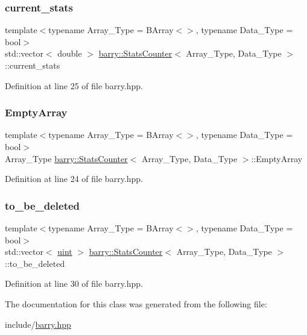\subsubsection{\texorpdfstring{current\+\_\+stats}{current\_stats}}
{\footnotesize\ttfamily template$<$typename Array\+\_\+\+Type  = B\+Array$<$$>$, typename Data\+\_\+\+Type  = bool$>$ \\
std\+::vector$<$ double $>$ \hyperlink{classbarry_1_1_stats_counter}{barry\+::\+Stats\+Counter}$<$ Array\+\_\+\+Type, Data\+\_\+\+Type $>$\+::current\+\_\+stats}



Definition at line 25 of file barry.\+hpp.

\mbox{\label{classbarry_1_1_stats_counter_ad78463fadfa385a69121c40fdc8fd193}} 
\subsubsection{\texorpdfstring{Empty\+Array}{EmptyArray}}
{\footnotesize\ttfamily template$<$typename Array\+\_\+\+Type  = B\+Array$<$$>$, typename Data\+\_\+\+Type  = bool$>$ \\
Array\+\_\+\+Type \hyperlink{classbarry_1_1_stats_counter}{barry\+::\+Stats\+Counter}$<$ Array\+\_\+\+Type, Data\+\_\+\+Type $>$\+::Empty\+Array}



Definition at line 24 of file barry.\+hpp.

\mbox{\label{classbarry_1_1_stats_counter_a332d678489f13664c0aad12cfd1aa725}} 
\subsubsection{\texorpdfstring{to\+\_\+be\+\_\+deleted}{to\_be\_deleted}}
{\footnotesize\ttfamily template$<$typename Array\+\_\+\+Type  = B\+Array$<$$>$, typename Data\+\_\+\+Type  = bool$>$ \\
std\+::vector$<$ \hyperlink{namespacebarry_a11dfc53ddb4672278319aa04f1e09a6c}{uint} $>$ \hyperlink{classbarry_1_1_stats_counter}{barry\+::\+Stats\+Counter}$<$ Array\+\_\+\+Type, Data\+\_\+\+Type $>$\+::to\+\_\+be\+\_\+deleted}



Definition at line 30 of file barry.\+hpp.



The documentation for this class was generated from the following file\+:\begin{DoxyCompactItemize}
\item 
include/\hyperlink{barry_8hpp}{barry.\+hpp}\end{DoxyCompactItemize}
